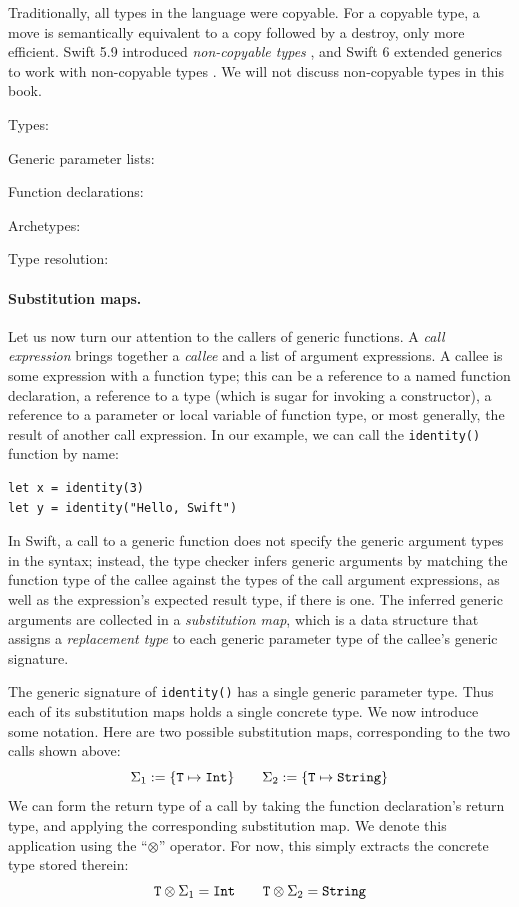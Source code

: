 \documentclass[../generics]{subfiles}
\begin{document}
Traditionally, all types in the language were copyable. For a copyable type, a move is semantically equivalent to a copy followed by a destroy, only more efficient. Swift 5.9 introduced \emph{non-copyable types} \cite{se0390}, and Swift 6 extended generics to work with non-copyable types \cite{se0427}. We will not discuss non-copyable types in this book.

\begin{MoreDetails}
\item Types: 
\item Generic parameter lists: 
\item Function declarations: 
\item Archetypes: 
\item Type resolution: 
\end{MoreDetails}

\paragraph{Substitution maps.} Let us now turn our attention to the callers of generic functions. A \emph{call expression} brings together a \emph{callee} and a list of argument expressions. A callee is some expression with a function type; this can be a reference to a named function declaration, a reference to a type (which is sugar for invoking a constructor), a reference to a parameter or local variable of function type, or most generally, the result of another call expression. In our example, we can call the \verb|identity()| function by name:
\begin{Verbatim}
let x = identity(3)
let y = identity("Hello, Swift")
\end{Verbatim}
In Swift, a call to a generic function does not specify the generic argument types in the syntax; instead, the type checker infers generic arguments by matching the function type of the callee against the types of the call argument expressions, as well as the expression's expected result type, if there is one. The inferred generic arguments are collected in a \emph{substitution map}, which is a data structure that assigns a \emph{replacement type} to each generic parameter type of the callee's generic signature.

The generic signature of \verb|identity()| has a single generic parameter type. Thus each of its substitution maps holds a single concrete type. We now introduce some notation. Here are two possible substitution maps, corresponding to the two calls shown above:
\[
\Sigma_1 := \{\texttt{T} \mapsto \texttt{Int}\}
\qquad
\Sigma_2 := \{\texttt{T} \mapsto \texttt{String}\}
\]
We can form the return type of a call by taking the function declaration's return type, and applying the corresponding substitution map. We denote this application using the ``$\otimes$'' operator. For now, this simply extracts the concrete type stored therein:
\[\texttt{T} \otimes \Sigma_1 = \texttt{Int}
\qquad
\texttt{T} \otimes \Sigma_2 = \texttt{String}
\]
\end{document}
